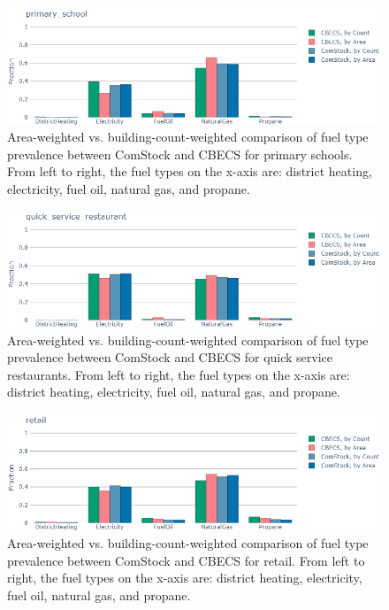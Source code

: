 \begin{figure}
  \centering
  \includegraphics[scale=0.5]{figures/cbecs_comstock_fuel_comparison_primary_school.png}
  \caption[Comparison of fuel type prevalence between ComStock and CBECS for primary schools]{Area-weighted vs. building-count-weighted comparison of fuel type prevalence between ComStock and CBECS for primary schools. From left to right, the fuel types on the x-axis are: district heating, electricity, fuel oil, natural gas, and propane.}
  \label{fig:cbecs_comstock_fuel_comparison_primary_school}
\end{figure}

\begin{figure}
  \centering
  \includegraphics[scale=0.5]{figures/cbecs_comstock_fuel_comparison_quick_service_restaurant.png}
  \caption[Comparison of fuel type prevalence between ComStock and CBECS for quick service restaurants]{Area-weighted vs. building-count-weighted comparison of fuel type prevalence between ComStock and CBECS for quick service restaurants. From left to right, the fuel types on the x-axis are: district heating, electricity, fuel oil, natural gas, and propane.}
  \label{fig:cbecs_comstock_fuel_comparison_quick_service_restaurant}
\end{figure}

\begin{figure}
  \centering
  \includegraphics[scale=0.5]{figures/cbecs_comstock_fuel_comparison_retail.png}
  \caption[Comparison of fuel type prevalence between ComStock and CBECS for retail]{Area-weighted vs. building-count-weighted comparison of fuel type prevalence between ComStock and CBECS for retail. From left to right, the fuel types on the x-axis are: district heating, electricity, fuel oil, natural gas, and propane.}
  \label{fig:cbecs_comstock_fuel_comparison_retail}
\end{figure}

